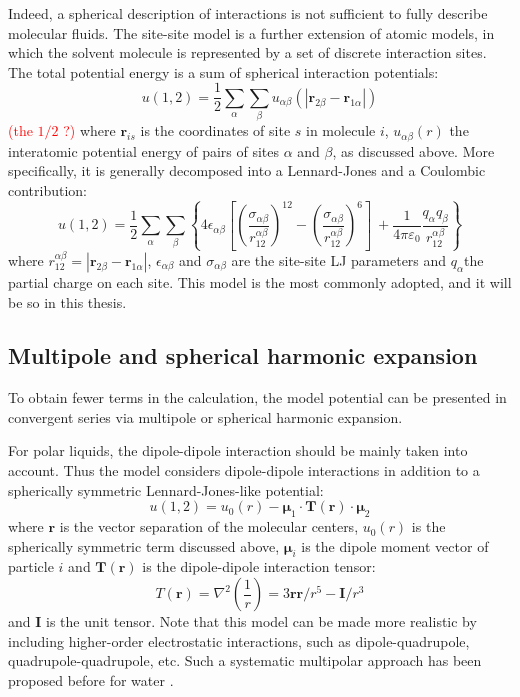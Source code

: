 Indeed, a spherical description of interactions is not sufficient
to fully describe molecular fluids. The site-site model is a further
extension of atomic models, in which the solvent molecule is represented
by a set of discrete interaction sites. The total potential energy
is a sum of spherical interaction potentials:
\begin{equation}
u(1,2)=\frac{1}{2}\sum_{\alpha}\sum_{\beta}u_{\alpha\beta}(\left|\mathbf{r}_{2\beta}-\mathbf{r}_{1\alpha}\right|)
\end{equation}
\textcolor{red}{(the $1/2$ ?) }where $\mathbf{r}_{is}$ is the coordinates
of site $s$ in molecule $i$, $u_{\alpha\beta}(r)$ the interatomic
potential energy of pairs of sites $\alpha$ and $\beta$, as discussed
above. More specifically, it is generally decomposed into a Lennard-Jones
and a Coulombic contribution:
\begin{equation}
u(1,2)=\frac{1}{2}\sum_{\alpha}\sum_{\beta}\left\{ 4\epsilon_{\alpha\beta}\left[\left(\frac{\sigma_{\alpha\beta}}{r_{12}^{\alpha\beta}}\right)^{12}-\left(\frac{\sigma_{\alpha\beta}}{r_{12}^{\alpha\beta}}\right)^{6}\right]\:+\frac{1}{4\pi\varepsilon_{0}}\frac{q_{\alpha}q_{\beta}}{r_{12}^{\alpha\beta}}\right\} 
\end{equation}
where $r_{12}^{\alpha\beta}=\left|\mathbf{r}_{2\beta}-\mathbf{r}_{1\alpha}\right|$,
$\epsilon_{\alpha\beta}$ and $\sigma_{\alpha\beta}$ are the site-site
LJ parameters and $q_{\alpha}$the partial charge on each site. This
model is the most commonly adopted, and it will be so in this thesis.

\subsection{Multipole and spherical harmonic expansion}

To obtain fewer terms in the calculation, the model potential can be
presented in convergent series via multipole or spherical harmonic
expansion.

For polar liquids, the dipole-dipole interaction should be mainly
taken into account. Thus the model considers dipole-dipole interactions
in addition to a spherically symmetric Lennard-Jones-like potential:
\begin{equation}
u(1,2)=u_{0}(r)-\boldsymbol{\mu}_{1}\cdot\mathbf{T}(\mathbf{r})\cdot\boldsymbol{\mu}_{2}
\end{equation}
where $\mathbf{r}$ is the vector separation of the molecular centers,
$u_{0}(r)$ is the spherically symmetric term discussed above, $\boldsymbol{\mu}_{i}$
is the dipole moment vector of particle $i$ and $\mathbf{T}(\mathbf{r})$
is the dipole-dipole interaction tensor:
\begin{equation}
T(\mathbf{r})=\nabla^{2}\left(\dfrac{1}{r}\right)=3\mathbf{r}\mathbf{r}/r^{5}-\mathbf{I}/r^{3}
\end{equation}
and $\mathbf{I}$ is the unit tensor. Note that this model can be
made more realistic by including higher-order electrostatic interactions,
such as dipole-quadrupole, quadrupole-quadrupole, etc. Such a systematic
multipolar approach has been proposed before for water \citep{Chowdhuri_2006}.


